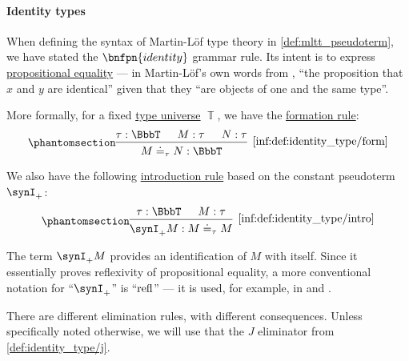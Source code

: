 \paragraph{Identity types}

\begin{definition}\label{def:identity_type}
  When defining the syntax of Martin-L\"of type theory in \cref{def:mltt_pseudoterm}, we have stated the \( \bnfpn{identity} \) grammar rule. Its intent is to express \hyperref[con:equality]{propositional equality} --- in Martin-L\"of's own words from \cite[81]{MartinLöf1975IntuitionisticTypeTheory}, \enquote{the proposition that \( x \) and \( y \) are identical} given that they \enquote{are objects of one and the same type}.

  More formally, for a fixed \hyperref[con:type_universe]{type universe} \( \BbbT \), we have the \hyperref[rem:type_theory_rule_classification/form]{formation rule}:
  \begin{equation*}\taglabel[\ensuremath{ =_{\logic{form}} }]{inf:def:identity_type/form}
    \begin{prooftree}
      \hypo{ \tau: \BbbT }
      \hypo{ M: \tau }
      \hypo{ N: \tau }
      \infer3[\ref{inf:def:identity_type/form}]{ M \syneq_{\tau} N: \BbbT }
    \end{prooftree}
  \end{equation*}

  We also have the following \hyperref[rem:type_theory_rule_classification/intro]{introduction rule} based on the constant pseudoterm \( \synI_+ \):
  \begin{equation*}\taglabel[\ensuremath{ =_+ }]{inf:def:identity_type/intro}
    \begin{prooftree}
      \hypo{ \tau: \BbbT }
      \hypo{ M: \tau }
      \infer2[\ref{inf:def:identity_type/intro}]{ \synI_+ M: M \syneq_\tau M }
    \end{prooftree}
  \end{equation*}

  The term \( \synI_+ M \) provides an identification of \( M \) with itself. Since it essentially proves reflexivity of propositional equality, a more conventional notation for \enquote{\( \synI_+ \)} is \enquote{\( \op{refl} \)} --- it is used, for example, in \cite[\S A.2.10]{UnivalentFoundationsProgram2013HoTT} and \cite[\S 9.1.3]{Mimram2020ProgramEqualsProof}.

  There are different elimination rules, with different consequences. Unless specifically noted otherwise, we will use that the \( J \) eliminator from \cref{def:identity_type/j}.


\end{definition}
